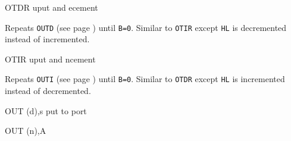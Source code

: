 \begin{basedescript}{
    \desclabelstyle{\multilinelabel}
    \desclabelwidth{3cm}}
    \pagebreak
    \begin{DetailItem}{OTDR}
        {uput and ecement}
        {\SymOTDR}

        Repeats {\tt OUTD} (see page \pageref{DetailRefOUTD}) until {\tt B=0}. Similar to {\tt OTIR} except {\tt HL} is decremented instead of incremented.

        \begin{DetailEffects}
            \FlagsOTDR
        \end{DetailEffects}
				
        \begin{DetailTiming}
        \end{DetailTiming}

    \end{DetailItem}

    \begin{DetailItem}{OTIR}
        {uput and ncement}
        {\SymOTIR}

        Repeats {\tt OUTI} (see page \pageref{DetailRefOUTI}) until {\tt B=0}. Similar to {\tt OTDR} except {\tt HL} is incremented instead of decremented.

        \begin{DetailEffects}
            \FlagsOTIR
        \end{DetailEffects}
				
        \begin{DetailTiming}
        \end{DetailTiming}

    \end{DetailItem}

    \pagebreak
    \begin{DetailItem}{OUT (d),s}
        {put to port}
        {}

        \begin{DetailVariants}
            OUT (n),A
			

\end{DetailVariants}
\end{DetailItem}
\end{basedescript}
